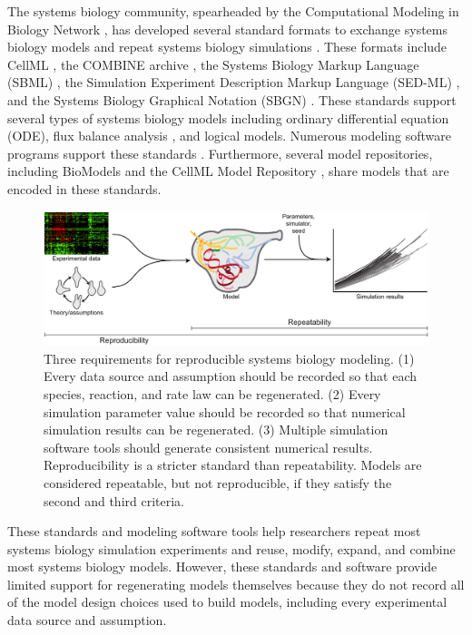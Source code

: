 \documentclass[journal,transmag,twoside]{IEEEtran}
\begin{document}
The systems biology community, spearheaded by the Computational Modeling in Biology Network \cite{hucka2015promoting}, has developed several standard formats to exchange systems biology models and repeat systems biology simulations \cite{drager2014improving}. These formats include CellML \cite{cuellar2003overview}, the COMBINE archive \cite{COMBINE2012}, the Systems Biology Markup Language (SBML) \cite{hucka2003}, the Simulation Experiment Description Markup Language (SED-ML) \cite{sedml2011}, and the Systems Biology Graphical Notation (SBGN) \cite{LeNovereHMMSS09}. These standards support several types of systems biology models including ordinary differential equation (ODE), flux balance analysis \cite{orth2010flux}, and logical models. Numerous modeling software programs support these standards \cite{hucka2011profile}. Furthermore, several model repositories, including BioModels \cite{chelliah2015biomodels} and the CellML Model Repository \cite{lloyd2008cellml}, share models that are encoded in these standards. 

\begin{figure}[!tb]
\centering
\includegraphics[width=\textwidth]{figure1/figure1}
\caption{Three requirements for reproducible systems biology modeling. (1) Every data source and assumption should be recorded so that each species, reaction, and rate law can be regenerated. (2) Every simulation parameter value should be recorded so that numerical simulation results can be regenerated. (3) Multiple simulation software tools should generate consistent numerical results. Reproducibility is a stricter standard than repeatability. Models are considered repeatable, but not reproducible, if they satisfy the second and third criteria.}
\label{fig_repro_diagram}
\end{figure}

These standards and modeling software tools help researchers repeat most systems biology simulation experiments and reuse, modify, expand, and combine most systems biology models. However, these standards and software provide limited support for regenerating models themselves because they do not record all of the model design choices used to build models, including every experimental data source and assumption.
\end{document}
